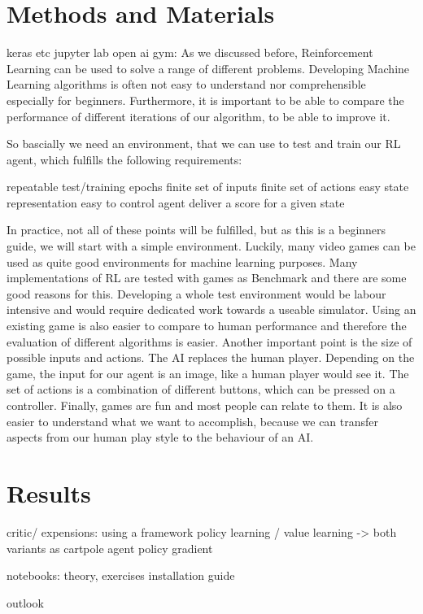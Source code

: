 \documentclass[a4paper]{article}
\begin{document}
	

	\section{Methods and Materials}
	
	keras etc
	jupyter lab
	open ai gym: 
		As we discussed before, Reinforcement Learning can be used to solve a range of different problems. Developing Machine Learning algorithms is often not easy to understand nor comprehensible especially for beginners. Furthermore, it is important to be able to compare the performance of different iterations of our algorithm, to be able to improve it.
		
		So bascially we need an environment, that we can use to test and train our RL agent, which fulfills the following requirements:
		
		repeatable test/training epochs
		finite set of inputs
		finite set of actions
		easy state representation
		easy to control agent
		deliver a score for a given state
		
		In practice, not all of these points will be fulfilled, but as this is a beginners guide, we will start with a simple environment. Luckily, many video games can be used as quite good environments for machine learning purposes. Many implementations of RL are tested with games as Benchmark and there are some good reasons for this. Developing a whole test environment would be labour intensive and would require dedicated work towards a useable simulator. Using an existing game is also easier to compare to human performance and therefore the evaluation of different algorithms is easier. Another important point is the size of possible inputs and actions. The AI replaces the human player. Depending on the game, the input for our agent is an image, like a human player would see it. The set of actions is a combination of different buttons, which can be pressed on a controller. Finally, games are fun and most people can relate to them. It is also easier to understand what we want to accomplish, because we can transfer aspects from our human play style to the behaviour of an AI. 

	
	\section{Results}
	critic/ expensions:
		using a framework
		policy learning / value learning -> both variants as cartpole agent
		policy gradient
	
	notebooks:
		theory, exercises
	installation guide
	
	outlook
	
	
	 
	
\end{document}
